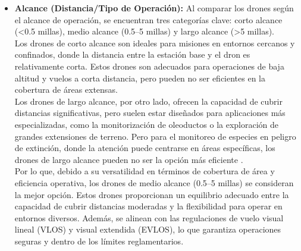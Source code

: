 \begin{itemize}
\item \textbf{Alcance (Distancia/Tipo de Operación):}
Al comparar los drones según el alcance de operación, se encuentran tres categorías clave: corto alcance (<0.5 millas), medio alcance (0.5–5 millas) y largo alcance (>5 millas). \\
Los drones de corto alcance son ideales para misiones en entornos cercanos y confinados, donde la distancia entre la estación base y el dron es relativamente corta. Estos drones son adecuados para operaciones de baja altitud y vuelos a corta distancia, pero pueden no ser eficientes en la cobertura de áreas extensas.\\
Los drones de largo alcance, por otro lado, ofrecen la capacidad de cubrir distancias significativas, pero suelen estar diseñados para aplicaciones más especializadas, como la monitorización de oleoductos o la exploración de grandes extensiones de terreno. Pero para el monitoreo de especies en peligro de extinción, donde la atención puede centrarse en áreas específicas, los drones de largo alcance pueden no ser la opción más eficiente \cite{tiposdrones}.\\
Por lo que, debido a su versatilidad en términos de cobertura de área y eficiencia operativa, los drones de medio alcance (0.5–5 millas) se consideran la mejor opción. Estos drones proporcionan un equilibrio adecuado entre la capacidad de cubrir distancias moderadas y la flexibilidad para operar en entornos diversos. Además, se alinean con las regulaciones de vuelo visual lineal (VLOS) y visual extendida (EVLOS), lo que garantiza operaciones seguras y dentro de los límites reglamentarios.


\end{itemize}
